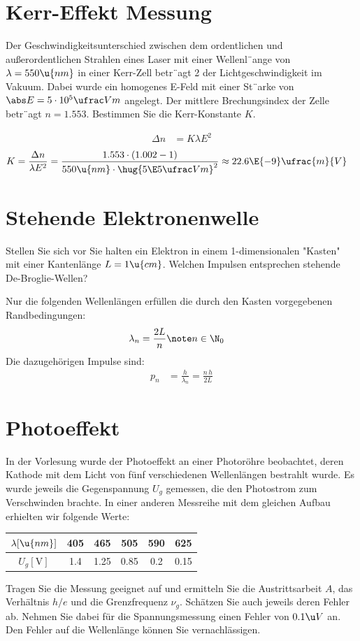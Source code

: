 \documentclass[ex,minted]{exercise}
\begin{document}
\section{Kerr-Effekt Messung}
Der Geschwindigkeitsunterschied zwischen dem ordentlichen und außerordentlichen 
Strahlen eines Laser mit einer Wellenl¨ange von $\lambda = 550 \u{nm}$ in einer 
Kerr-Zell betr¨agt 2\textperthousand{} der Lichtgeschwindigkeit im Vakuum. Dabei wurde ein
homogenes E-Feld mit einer St¨arke von $\abs E = 5 \cdot 10^5 \ufrac Vm$
angelegt. Der mittlere Brechungsindex der Zelle betr¨agt
$n = 1.553$. Bestimmen Sie die Kerr-Konstante $K$.

\dottedlinete

\begin{align*}
    \Delta n &= K \lambda E^2
\end{align*}\tight
\begin{align*}
    K &= \frac{\Delta n}{\lambda E^2}
    = \frac{1.553\cdot(1.002 - 1)}{550\u{nm} \cdot \hug{5\E5\ufrac Vm}^2}
    \approx 22.6\E{-9}\ufrac{m}{V}
\end{align*}

\section{Stehende Elektronenwelle}
Stellen Sie sich vor Sie halten ein Elektron in einem 1-dimensionalen "Kasten" mit einer 
Kantenlänge \(L=1\u{cm}\). Welchen Impulsen entsprechen stehende De-Broglie-Wellen?

\dottedlinett

Nur die folgenden Wellenlängen erfüllen die durch den Kasten 
vorgegebenen Randbedingungen:
\begin{align*}
    \lambda_n &=  \frac{2L}{n} \note n\in\N_0
\end{align*}
Die dazugehörigen Impulse sind:
\begin{align*}
    p_n &= \frac{h}{\lambda_n} = \frac{n \,h}{2L}
\end{align*}

\section{Photoeffekt}
In der Vorlesung wurde der Photoeffekt an einer Photoröhre beobachtet, deren Kathode
mit dem Licht von fünf verschiedenen Wellenlängen bestrahlt wurde. Es wurde jeweils die 
Gegenspannung \(U_g\) gemessen, die den Photostrom zum Verschwinden brachte. In einer 
anderen Messreihe mit dem gleichen Aufbau erhielten wir folgende Werte: 
\begin{center}
    \begin{tabular}{c|ccccc}
        $\lambda[\u{nm}]$ & 405 & 465&505&590&625\\\hline
        $U_g[\mathrm V]$ &1.4&1.25&0.85&0.2&0.15
    \end{tabular}
\end{center}
Tragen Sie die Messung geeignet auf und ermitteln Sie die Austrittsarbeit \(A\), das 
Verhältnis \(h/e\) und die Grenzfrequenz \(\nu_g\). Schätzen Sie auch jeweils 
deren Fehler ab. Nehmen Sie dabei für die Spannungsmessung einen Fehler 
von \(0.1\u V\) an. Den Fehler auf die Wellenlänge können Sie vernachlässigen.
\end{document}

